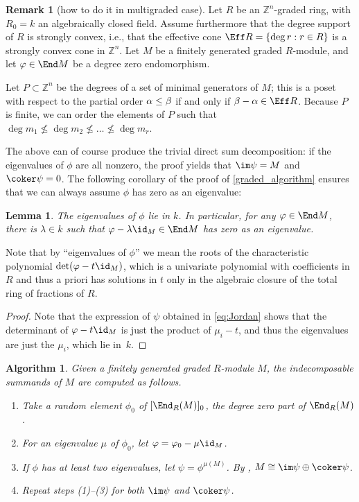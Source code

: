 \documentclass[12pt]{article}
\let\b\beta
\let\l\lambda
\def\ZZ{\mathbb Z}
\theoremstyle{theorem}
\numberwithin{thm}{section}
\newtheorem{algm}[thm]{Algorithm}
\newtheorem{lem}[thm]{Lemma}
\theoremstyle{definition}
\newtheorem{rem}[thm]{Remark}
\begin{document}
\begin{rem}[how to do it in multigraded case]
  Let $R$ be an $\ZZ^n$-graded ring, with $R_0=k$ an algebraically closed field.
  Assume furthermore that the degree support of $R$ is strongly convex, i.e., that
  the effective cone
  $\Eff R = \{ \deg r : r\in R\}$ is a strongly convex cone in $\ZZ^n$.
  Let $M$ be a finitely generated graded $R$-module, and let $\phi \in \End M$ be a degree zero endomorphism.

  Let $P\subset \ZZ^n$ be the degrees of a set of minimal generators of $M$;
  this is a poset with respect to the partial order $\a\leq \b$ if and only if $\b-\a\in \Eff R$.
  Because $P$ is finite, we can order the elements of $P$ such that
  $\deg m_1\not\leq \deg m_2\not \leq \dots\not\leq \deg m_r$.


\end{rem}

The above can of course produce the trivial direct sum decomposition: if the eigenvalues of $\phi$ are all nonzero, the proof yields that $\im \psi = M$ and $\coker \psi = 0$. The following corollary of the proof of \cref{graded_algorithm} ensures that we can always assume $\phi$ has zero as an eigenvalue:

\begin{lem}
  The eigenvalues of $\phi$ lie in $k$.
  In particular,
  for any  $\phi \in \End M$, there is $\l \in k$ such that $\phi - \l \id_M \in \End M$ has zero as an eigenvalue.
\end{lem}


Note that by ``eigenvalues of $\phi$'' we mean the roots of the characteristic polynomial $\det(\phi - t \id_M)$, which is a univariate polynomial with coefficients in $R$ and thus a priori has solutions in $t$ only in the algebraic closure of the total ring of fractions of $R$.

\begin{proof}
  Note that the expression of $\psi$ obtained in \cref{eq:Jordan} shows that the determinant of $\phi - t \id_M$ is just the product of $\mu_i -t$, and thus the eigenvalues are just the $\mu_i$, which lie in~$k$.
\end{proof}

\begin{algm}
  \label{alg:graded}
  Given a finitely generated graded $R$-module $M$, the indecomposable summands of $M$ are computed as follows.
  \begin{enumerate}
  \item\label{item:End0} Take a random element $\phi_0$ of $[\End_R(M)]_0$, the degree zero part of $\End_R(M)$.
  \item For an eigenvalue $\mu $ of $\phi_0$, let $\phi=\phi_0-\mu \id_M$.
  \item If $\phi$ has at least two eigenvalues, let $\psi=\phi^{\mu(M)}$. By , $M\cong \im \psi \oplus \coker \psi$.  \item Repeat steps (1)--(3) for both $\im \psi$ and $\coker \psi$.
  \end{enumerate}
\end{algm}
\end{document}

